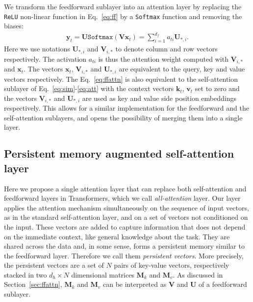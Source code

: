 \documentclass{article}
\newcommand{\secc}[1]{Section~\ref{sec:#1}}
\newcommand{\eq}[1]{Eq.~\ref{eq:#1}}
\begin{document}
We transform the feedforward sublayer into an attention layer by replacing the \texttt{ReLU} non-linear function in \eq{ff} by a \texttt{Softmax} function and removing the biases:
\begin{eqnarray}\label{eq:ffattn}
  \mathbf{y}_t = \mathbf{U} \texttt{Softmax}(\mathbf{V} \mathbf{x}_t) = \sum_{i=1}^{d_f} a_{ti} \mathbf{U}_{*,i}.
\end{eqnarray}
Here we use notations $\mathbf{U}_{*,i}$ and $\mathbf{V}_{i,*}$ to denote column and row vectors respectively.
The activation $a_{ti}$ is thus the attention weight computed with $\mathbf{V}_{i,*}$ and $\mathbf{x}_t$.
The vectors $\mathbf{x}_t$, $\mathbf{V}_{i,*}$ and $\mathbf{U}_{*,i}$ are equivalent to the query, key and value vectors respectively.
The \eq{ffattn} is also equivalent to the self-attention sublayer of Eq.~\ref{eq:sim}-\ref{eq:att} with the context vectors $\mathbf{k}_t$, $\mathbf{v}_t$ set to zero and the vectors $\mathbf{V}_{i,*}$ and $\mathbf{U}_{*,i}$ are used as key and value side position embeddings respectively.
This allows for a similar implementation for the feedforward and the self-attention sublayers, and opens the possibility of merging them into a single layer.


\subsection{Persistent memory augmented self-attention layer}
Here we propose a single attention layer that can replace both self-attention and feedforward layers in Transformers, which we call \emph{all-attention} layer.
Our layer applies the attention mechanism simultaneously on the sequence of input vectors, as in the standard self-attention layer, and on a set of vectors not conditioned on the input.
These vectors are added to capture information that does not depend on the immediate context, like general knowledge about the task.
They are shared across the data and, in some sense, forms a persistent memory similar to the feedforward layer. Therefore we call them \emph{persistent vectors}.
More precisely, the persistent vectors are a set of $N$ pairs of key-value vectors, respectively stacked in two $d_h \times N$ dimensional matrices $\mathbf{M}_k$ and $\mathbf{M}_v$.
As discussed in \secc{ffattn}, $\mathbf{M}_k$ and $\mathbf{M}_v$ can be interpreted as $\mathbf{V}$ and $\mathbf{U}$ of a feedforward sublayer.
\end{document}
